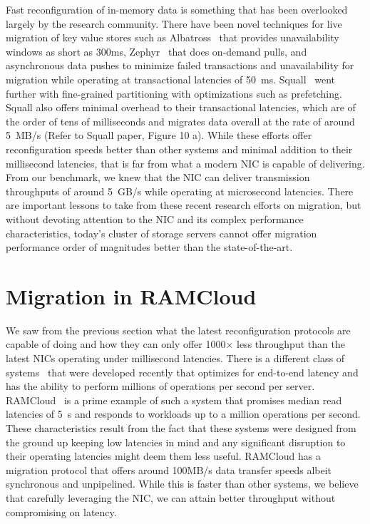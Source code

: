 Fast reconfiguration of in-memory data is something that has been overlooked largely
by the research community. There have been novel techniques for live migration of 
key value stores such as Albatross~\cite{albatross} that provides unavailability windows 
as short as 300ms, Zephyr~\cite{zephyr} that does on-demand pulls, and asynchronous data 
pushes to minimize failed transactions and unavailability for migration while operating 
at transactional latencies of 50~ms. Squall~\cite{squall} went further with fine-grained 
partitioning with optimizations such as prefetching. Squall also offers minimal overhead 
to their transactional latencies, which are of the order of tens of milliseconds and migrates 
data overall at the rate of around 5~MB/s (Refer to Squall paper, Figure 10 a). While these efforts offer reconfiguration speeds 
better than other systems and minimal addition to their millisecond latencies, that is far 
from what a modern NIC is capable of delivering. From our benchmark, we knew that the NIC 
can deliver transmission throughputs of around 5~GB/s while operating at microsecond latencies. 
There are important lessons to take from these recent research efforts on migration, but without 
devoting attention to the NIC and its complex performance characteristics, today's cluster of
storage servers cannot offer migration performance order of magnitudes better than the state-of-the-art.

\section{Migration in RAMCloud}
We saw from the previous section what the latest reconfiguration protocols are capable of doing and how they can only 
offer 1000$\times$ less throughput than the latest NICs operating under millisecond latencies. There is a different class of systems~\cite{ramcloud,farm,rdmabillion,herd} that 
were developed recently that optimizes for end-to-end latency and has the ability to perform millions of operations 
per second per server. RAMCloud~\cite{ramcloud} is a prime example of such a system that promises median read latencies 
of 5\textmu~s and responds to workloads up to a million operations per second. These characteristics result from the fact that 
these systems were designed from the ground up keeping low latencies in mind and any significant disruption to their operating 
latencies might deem them less useful. RAMCloud has a migration protocol that offers around 100MB/s data transfer speeds albeit 
synchronous and unpipelined. While this is faster than other systems, we believe that carefully leveraging the NIC, 
we can attain better throughput without compromising on latency.

